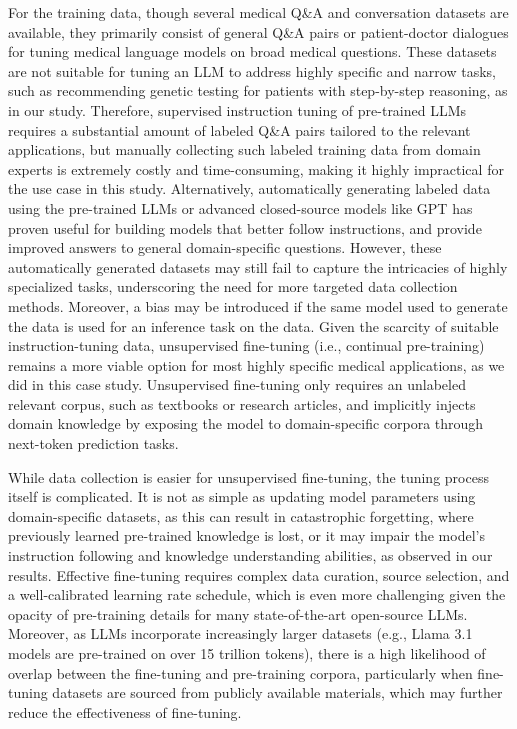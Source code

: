\documentclass[fleqn,10pt]{wlscirep}
\begin{document}
For the training data, though several medical Q\&A and conversation datasets are available, they primarily consist of general Q\&A pairs or patient-doctor dialogues for tuning medical language models on broad medical questions. These datasets are not suitable for tuning an LLM to address highly specific and narrow tasks, such as recommending genetic testing for patients with step-by-step reasoning, as in our study. Therefore, supervised instruction tuning of pre-trained LLMs requires a substantial amount of labeled Q\&A pairs tailored to the relevant applications, but manually collecting such labeled training data from domain experts is extremely costly and time-consuming, making it highly impractical for the use case in this study. Alternatively, automatically generating labeled data using the pre-trained LLMs or advanced closed-source models like GPT has proven useful for building models that better follow instructions, and provide improved answers to general domain-specific questions. However, these automatically generated datasets may still fail to capture the intricacies of highly specialized tasks, underscoring the need for more targeted data collection methods. Moreover, a bias may be introduced if the same model used to generate the data is used for an inference task on the data. Given the scarcity of suitable instruction-tuning data, unsupervised fine-tuning (i.e., continual pre-training) remains a more viable option for most highly specific medical applications, as we did in this case study. Unsupervised fine-tuning only requires an unlabeled relevant corpus, such as textbooks or research articles, and implicitly injects domain knowledge by exposing the model to domain-specific corpora through next-token prediction tasks. 

While data collection is easier for unsupervised fine-tuning, the tuning process itself is complicated. It is not as simple as updating model parameters using domain-specific datasets, as this can result in catastrophic forgetting, where previously learned pre-trained knowledge is lost, or it may impair the model’s instruction following and knowledge understanding abilities, as observed in our results. Effective fine-tuning requires complex data curation, source selection, and a well-calibrated learning rate schedule, which is even more challenging given the opacity of pre-training details for many state-of-the-art open-source LLMs. Moreover, as LLMs incorporate increasingly larger datasets (e.g., Llama 3.1 models are pre-trained on over 15 trillion tokens), there is a high likelihood of overlap between the fine-tuning and pre-training corpora, particularly when fine-tuning datasets are sourced from publicly available materials, which may further reduce the effectiveness of fine-tuning.
\end{document}
